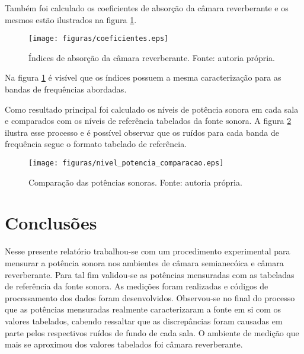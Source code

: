 \newpage
Também foi calculado os coeficientes de absorção da câmara reverberante e os mesmos estão ilustrados na figura \ref{figura_7}.
\begin{figure}[h!]
    \hspace{-4.5cm}
    \texttt{[image: figuras/coeficientes.eps]}
    \caption{Índices de absorção da câmara reverberante. Fonte: autoria própria.}
    \label{figura_7}
\end{figure}
Na figura \ref{figura_7} é visível que os índices possuem a mesma caracterização para as bandas de frequências abordadas.

\newpage
Como resultado principal foi calculado os níveis de potência sonora em cada sala e comparados com os níveis de referência tabelados da fonte sonora. A figura \ref{figura_8} ilustra esse processo e é possível observar que os ruídos para cada banda de frequência segue o formato tabelado de referência.
\begin{figure}[h!]
    \hspace{-4.5cm}
    \texttt{[image: figuras/nivel\_potencia\_comparacao.eps]}
    \caption{Comparação das potências sonoras. Fonte: autoria própria.}
    \label{figura_8}
\end{figure}

\chapter{Conclusões}\label{conclusoes}

Nesse presente relatório trabalhou-se com um procedimento experimental para mensurar a potência sonora nos ambientes de câmara semianecóica e câmara reverberante. Para tal fim validou-se as potências mensuradas com as tabeladas de referência da fonte sonora. As medições foram realizadas e códigos de processamento dos dados foram desenvolvidos. Observou-se no final do processo que as potências	mensuradas realmente caracterizaram a fonte em si com os valores tabelados, cabendo ressaltar que as discrepâncias foram causadas em parte pelos respectivos ruídos de fundo de cada sala. O ambiente de medição que mais se aproximou dos valores tabelados foi câmara reverberante.